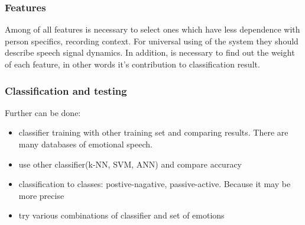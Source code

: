 \documentclass[14pt]{extarticle}
\begin{document}
\subsubsection{Features}
Among of all features is necessary to select ones which have less dependence with person specifics, recording context. For universal using of the system they should describe speech signal dynamics. In addition, is necessary to find out the weight of each feature, in other words it's contribution to classification result.

\subsubsection{Classification and testing}
Further can be done:
\begin{itemize}
	\item classifier training with other training set and comparing results. There are many databases of emotional speech.
	\item use other classifier(k-NN, SVM, ANN) and compare accuracy
	\item classification to classes: postive-nagative, passive-active. Because it may be more precise
	\item try various combinations of classifier and set of emotions
\end{itemize}
\end{document}
